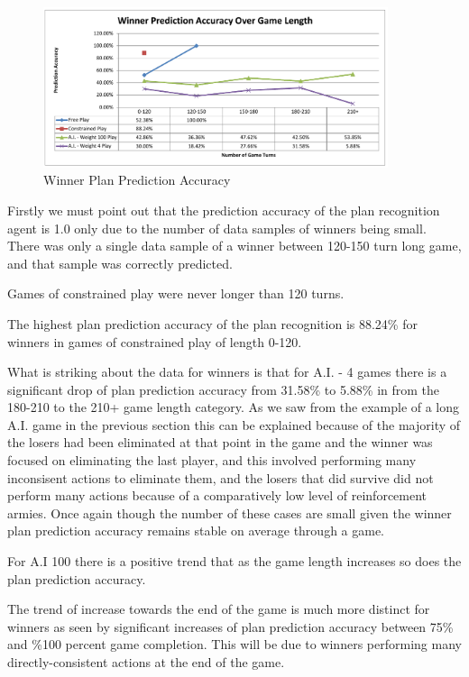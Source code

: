 \documentclass[parskip]{cs4rep}
\begin{document}
\begin{figure}[h]
\centerline{
\includegraphics[width=0.9\textwidth]{images/winner-game-length.pdf}
}
\caption{Winner Plan Prediction Accuracy}
\label{fig:dom-debug-gui}
\end{figure} 

Firstly we must point out that the prediction accuracy of the plan recognition agent is 1.0 only due to the number of data samples of winners being small. There was only a single data sample of a winner between 120-150 turn long game, and that sample was correctly predicted.

Games of constrained play were never longer than 120 turns.

The highest plan prediction accuracy of the plan recognition is 88.24\% for winners in games of constrained play of length 0-120.

What is striking about the data for winners is that for A.I. - 4 games there is a significant drop of plan prediction accuracy from 31.58\% to 5.88\% in from the 180-210 to the 210+ game length category. As we saw from the example of a long A.I. game in the previous section this can be explained because of the majority of the losers had been eliminated at that point in the game and the winner was focused on eliminating the last player, and this involved performing many inconsisent actions to eliminate them, and the losers that did survive did not perform many actions because of a comparatively low level of reinforcement armies. Once again though the number of these cases are small given the winner plan prediction accuracy remains stable on average through a game.

For A.I 100 there is a positive trend that as the game length increases so does the plan prediction accuracy.

The trend of increase towards the end of the game is much more distinct for winners as seen by significant increases of plan prediction accuracy between 75\% and \%100 percent game completion. This will be due to winners performing many directly-consistent actions at the end of the game.
\end{document}
